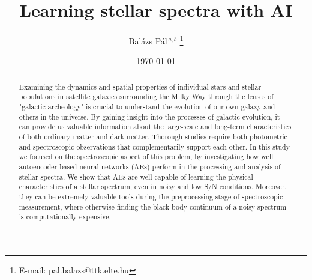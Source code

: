 \documentclass[12pt, a4paper]{article}
\title{Learning stellar spectra with AI}
\author{Balázs Pál$^{\,a,b}$%
    \thanks{E-mail: pal.balazs@ttk.elte.hu}
}
\affil{%
    $^{a}$Eötvös Loránd University, Department of Physics of Complex Systems \\
    $^{b}$Wigner Research Centre for Physics, Heavy-ion Physics Research Group
}
\date{\today}
\begin{document}
\maketitle

\begin{abstract}
Examining the dynamics and spatial properties of individual stars and stellar populations in satellite galaxies surrounding the Milky Way through the lenses of "galactic archeology" is crucial to understand the evolution of our own galaxy and others in the universe. By gaining insight into the processes of galactic evolution, it can provide us valuable information about the large-scale and long-term characteristics of both ordinary matter and dark matter. Thorough studies require both photometric and spectroscopic observations that complementarily support each other. In this study we focused on the spectroscopic aspect of this problem, by investigating how well autoencoder-based neural networks (AEs) perform in the processing and analysis of stellar spectra. We show that AEs are well capable of learning the physical characteristics of a stellar spectrum, even in noisy and low S/N conditions. Moreover, they can be extremely valuable tools during the preprocessing stage of spectroscopic measurement, where otherwise finding the black body continuum of a noisy spectrum is computationally expensive.
\end{abstract}
\end{document}

